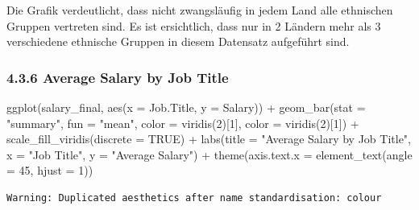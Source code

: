 \documentclass[
  letterpaper,
  DIV=11,
  numbers=noendperiod]{scrartcl}
\newenvironment{Shaded}{\begin{snugshade}}{\end{snugshade}}
\newcommand{\AttributeTok}[1]{\textcolor[rgb]{0.40,0.45,0.13}{#1}}
\newcommand{\ConstantTok}[1]{\textcolor[rgb]{0.56,0.35,0.01}{#1}}
\newcommand{\DecValTok}[1]{\textcolor[rgb]{0.68,0.00,0.00}{#1}}
\newcommand{\FunctionTok}[1]{\textcolor[rgb]{0.28,0.35,0.67}{#1}}
\newcommand{\NormalTok}[1]{\textcolor[rgb]{0.00,0.23,0.31}{#1}}
\newcommand{\SpecialCharTok}[1]{\textcolor[rgb]{0.37,0.37,0.37}{#1}}
\newcommand{\StringTok}[1]{\textcolor[rgb]{0.13,0.47,0.30}{#1}}
\begin{document}
Die Grafik verdeutlicht, dass nicht zwangsläufig in jedem Land alle
ethnischen Gruppen vertreten sind. Es ist ersichtlich, dass nur in 2
Ländern mehr als 3 verschiedene ethnische Gruppen in diesem Datensatz
aufgeführt sind.

\hypertarget{average-salary-by-job-title}{%
\subsubsection{4.3.6 Average Salary by Job
Title}\label{average-salary-by-job-title}}

\begin{Shaded}
\begin{Highlighting}[]
\FunctionTok{ggplot}\NormalTok{(salary\_final, }\FunctionTok{aes}\NormalTok{(}\AttributeTok{x =}\NormalTok{ Job.Title, }\AttributeTok{y =}\NormalTok{ Salary)) }\SpecialCharTok{+}
  \FunctionTok{geom\_bar}\NormalTok{(}\AttributeTok{stat =} \StringTok{"summary"}\NormalTok{, }\AttributeTok{fun =} \StringTok{"mean"}\NormalTok{, }\AttributeTok{color =} \FunctionTok{viridis}\NormalTok{(}\DecValTok{2}\NormalTok{)[}\DecValTok{1}\NormalTok{], }\AttributeTok{color =} \FunctionTok{viridis}\NormalTok{(}\DecValTok{2}\NormalTok{)[}\DecValTok{1}\NormalTok{]) }\SpecialCharTok{+}
  \FunctionTok{scale\_fill\_viridis}\NormalTok{(}\AttributeTok{discrete =} \ConstantTok{TRUE}\NormalTok{) }\SpecialCharTok{+}
  \FunctionTok{labs}\NormalTok{(}\AttributeTok{title =} \StringTok{"Average Salary by Job Title"}\NormalTok{,}
       \AttributeTok{x =} \StringTok{"Job Title"}\NormalTok{,}
       \AttributeTok{y =} \StringTok{"Average Salary"}\NormalTok{) }\SpecialCharTok{+}
  \FunctionTok{theme}\NormalTok{(}\AttributeTok{axis.text.x =} \FunctionTok{element\_text}\NormalTok{(}\AttributeTok{angle =} \DecValTok{45}\NormalTok{, }\AttributeTok{hjust =} \DecValTok{1}\NormalTok{))  }
\end{Highlighting}
\end{Shaded}

\begin{verbatim}
Warning: Duplicated aesthetics after name standardisation: colour
\end{verbatim}
\end{document}
